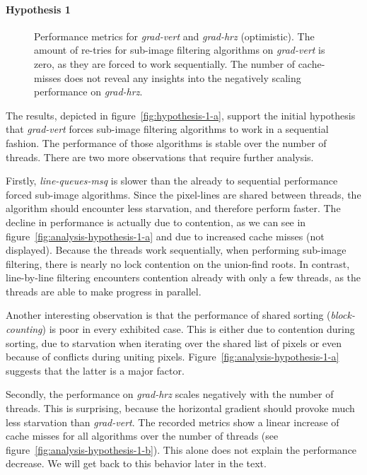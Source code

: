 \paragraph{Hypothesis 1}

\begin{figure}
  \centering
  \caption[Performance metrics for \emph{grad-vert} and \emph{grad-hrz}
  (optimistic).]{Performance metrics for \emph{grad-vert} and \emph{grad-hrz}
    (optimistic). The amount of re-tries for sub-image filtering algorithms on
    \emph{grad-vert} is zero, as they are forced to work sequentially. The
    number of cache-misses does not reveal any insights into the negatively
    scaling performance on \emph{grad-hrz}.}
  \label{fig:analysis-hypothesis-1}
\end{figure}

The results, depicted in figure~\ref{fig:hypothesis-1-a}, support the initial
hypothesis that \emph{grad-vert} forces sub-image filtering algorithms to work
in a sequential fashion. The performance of those algorithms is stable over the
number of threads. There are two more observations that require further
analysis.

Firstly, \emph{line-queues-msq} is slower than the already to sequential
performance forced sub-image algorithms. Since the pixel-lines are shared
between threads, the algorithm should encounter less starvation, and therefore
perform faster. The decline in performance is actually due to contention, as we
can see in figure~\ref{fig:analysis-hypothesis-1-a} and due to increased cache
misses (not displayed). Because the threads work sequentially, when performing
sub-image filtering, there is nearly no lock contention on the union-find
roots. In contrast, line-by-line filtering encounters contention already with
only a few threads, as the threads are able to make progress in parallel.

Another interesting observation is that the performance of shared sorting
(\emph{block-counting}) is poor in every exhibited case. This is either due to
contention during sorting, due to starvation when iterating over the shared list
of pixels or even because of conflicts during uniting
pixels. Figure~\ref{fig:analysis-hypothesis-1-a} suggests that the latter is a
major factor.

Secondly, the performance on \emph{grad-hrz} scales negatively with the number
of threads. This is surprising, because the horizontal gradient should provoke
much less starvation than \emph{grad-vert}. The recorded metrics show a linear
increase of cache misses for all algorithms over the number of threads (see
figure~\ref{fig:analysis-hypothesis-1-b}). This alone does not explain the
performance decrease. We will get back to this behavior later in the text.

